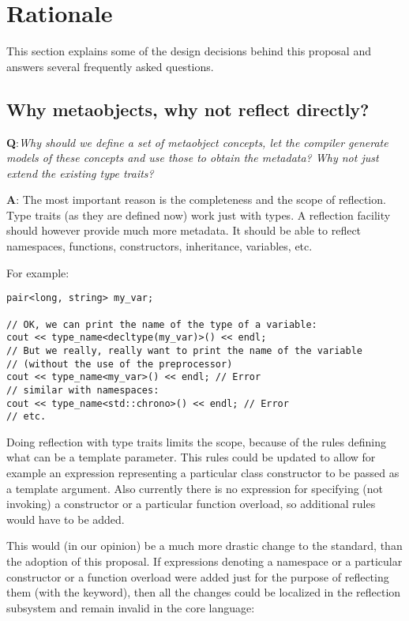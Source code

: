 \section{Rationale}

This section explains some of the design decisions behind this proposal and
answers several frequently asked questions.

\subsection{Why metaobjects, why not reflect directly?}

{\textbf Q:}{\em Why should we define a set of metaobject concepts, let the compiler generate
models of these concepts and use those to obtain the metadata? Why not just extend the existing
type traits?}

{\textbf A:} The most important reason is the completeness and the scope of reflection.
Type traits (as they are defined now) work just with types. A reflection facility should
however provide much more metadata.
It should be able to reflect namespaces, functions, constructors, inheritance, variables, etc.

For example:

\begin{verbatim}
pair<long, string> my_var;

// OK, we can print the name of the type of a variable:
cout << type_name<decltype(my_var)>() << endl;
// But we really, really want to print the name of the variable
// (without the use of the preprocessor)
cout << type_name<my_var>() << endl; // Error
// similar with namespaces:
cout << type_name<std::chrono>() << endl; // Error
// etc.
\end{verbatim}


Doing reflection with type traits limits the scope, because of the rules defining what
can be a template parameter. This rules could be updated to allow for example an expression
representing a particular class constructor to  be passed as a template argument.
Also currently there is no expression for specifying (not invoking) a constructor
or a particular function overload, so additional rules would have to be added.

This would (in our opinion) be a much more drastic change to the standard, than
the adoption of this proposal. If expressions denoting a namespace or a particular
constructor or a function overload were added just for the purpose of reflecting
them (with the \verb@mirroed@ keyword), then all the changes could be localized
in the reflection subsystem and remain invalid in the core language:

